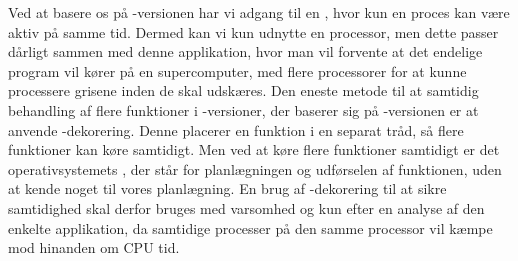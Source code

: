 Ved at basere os på -versionen har vi adgang til en \sched, hvor kun en proces  kan være aktiv på samme tid. Dermed kan vi kun udnytte en processor, men dette passer dårligt sammen med denne applikation, hvor man vil forvente at det endelige program vil kører på en supercomputer, med flere processorer for at kunne processere grisene inden de skal udskæres.  Den eneste metode til at samtidig behandling af flere funktioner i \pycsp-versioner, der baserer sig på -versionen er at anvende -dekorering. Denne placerer en funktion i en separat tråd, så flere funktioner kan køre samtidigt. Men ved at køre flere funktioner samtidigt er det operativsystemets \sched, der står for planlægningen og  udførselen af funktionen, uden at kende noget til vores planlægning. En brug af -dekorering til at sikre samtidighed skal derfor bruges med varsomhed og kun efter en analyse af den enkelte applikation, da samtidige processer på den samme processor vil kæmpe mod hinanden om CPU tid.
 
